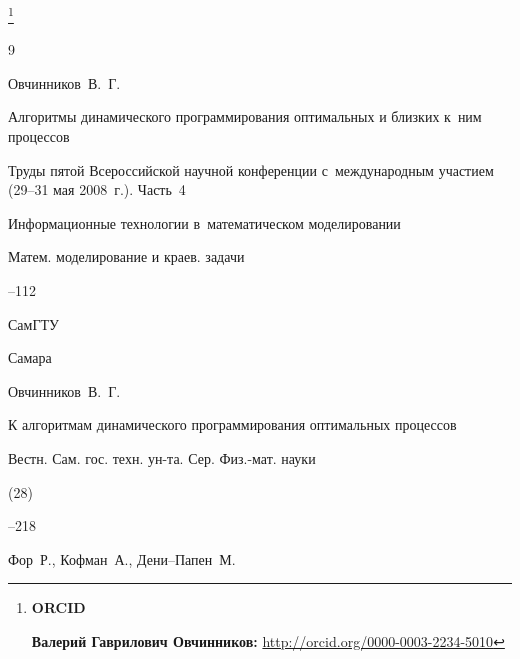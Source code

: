 {

\thanks{{\bf ORCID} 



{\bf Валерий Гаврилович Овчинников:} \url{http://orcid.org/0000-0003-2234-5010}



}}





\newpage



\RusRef





\begin{thebibliography}{9}




\by Овчинников~В.~Г.

\paper Алгоритмы динамического программирования оптимальных и близких к~ним процессов

\inbook Труды пятой Всероссийской научной конференции с~международным участием \rm (29--31 мая 2008~г.). Часть~4

\bookinfo Информационные технологии в~математическом моделировании

\serial Матем. моделирование и краев. задачи


--112

\publ СамГТУ

\publaddr Самара





\by Овчинников~В.~Г.

\paper К алгоритмам динамического программирования оптимальных процессов

\jour Вестн. Сам. гос. техн. ун-та. Сер. Физ.-мат. науки


(28)

--218






\by Фор~Р., Кофман~А., Дени--Папен~М.


\end{thebibliography}
